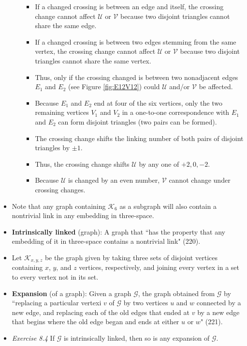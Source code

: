 \documentclass[titlepage]{article}
\numberwithin{figure}{section}
\numberwithin{table}{section}
\numberwithin{equation}{section}
\newcommand{\dq}[2]{``#1" (#2).}
\begin{document}
\begin{itemize}
\begin{itemize}
\begin{itemize}
            \item If a changed crossing is between an edge and itself, the crossing change cannot affect $\mathcal{U}$ or $\mathcal{V}$ because two disjoint triangles cannot share the same edge.
            \item If a changed crossing is between two edges stemming from the same vertex, the crossing change cannot affect $\mathcal{U}$ or $\mathcal{V}$ because two disjoint triangles cannot share the same vertex.
            \item Thus, only if the crossing changed is between two nonadjacent edges $E_1$ and $E_2$ (see Figure \ref{fig:E12V12}) could $\mathcal{U}$ and/or $\mathcal{V}$ be affected.
            \item Because $E_1$ and $E_2$ end at four of the six vertices, only the two remaining vertices $V_1$ and $V_2$ in a one-to-one correspondence with $E_1$ and $E_2$ can form disjoint triangles (two pairs can be formed).
            \item The crossing change shifts the linking number of both pairs of disjoint triangles by $\pm 1$.
            \item Thus, the crossing change shifts $\mathcal{U}$ by any one of $+2,0,-2$.
            \item Because $\mathcal{U}$ is changed by an even number, $\mathcal{V}$ cannot change under crossing changes.
        \end{itemize}
    \end{itemize}
    \item Note that any graph containing $\mathcal{K}_6$ as a subgraph will also contain a nontrivial link in any embedding in three-space.
    \item \textbf{Intrinsically linked} (graph): A graph that \dq{has the property that any embedding of it in three-space contains a nontrivial link}{220}
    \item Let $\mathcal{K}_{x,y,z}$ be the graph given by taking three sets of disjoint vertices containing $x$, $y$, and $z$ vertices, respectively, and joining every vertex in a set to every vertex not in its set.
    \item \textbf{Expansion} (of a graph): Given a graph $\mathcal{G}$, the graph obtained from $\mathcal{G}$ by \dq{replacing a particular vertexi $v$ of $\mathcal{G}$ by two vertices $u$ and $w$ connected by a new edge, and replacing each of the old edges that ended at $v$ by a new edge that begins where the old edge began and ends at either $u$ or $w$}{221}
    \item \emph{Exercise 8.4} If $\mathcal{G}$ is intrinsically linked, then so is any expansion of $\mathcal{G}$.

\end{itemize}
\end{document}
